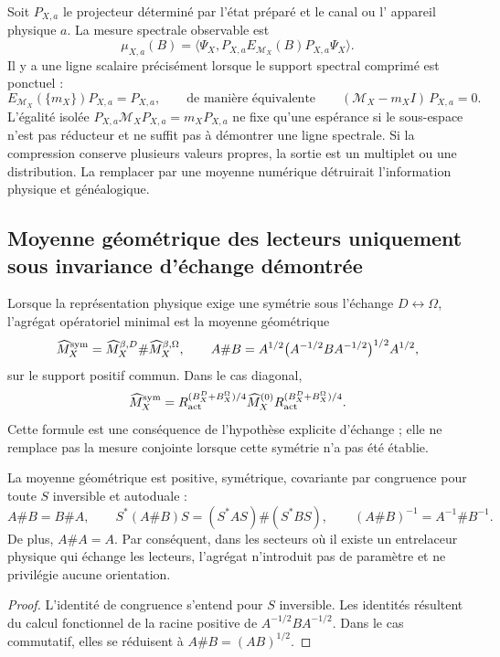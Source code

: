 Soit \(P_{X,a}\) le projecteur déterminé par l'état préparé et le canal ou l'
appareil physique \(a\). La mesure spectrale observable est
\[
 \mu_{X,a}(B)=
 \langle\Psi_X,
 P_{X,a}E_{\mathcal M_X}(B)P_{X,a}\Psi_X\rangle.
\]
Il y a une ligne scalaire précisément lorsque le support spectral comprimé est
ponctuel :
\[
 E_{\mathcal M_X}(\{m_X\})P_{X,a}=P_{X,a},
 \qquad\text{de manière équivalente}\qquad
 (\mathcal M_X-m_X I)\,P_{X,a}=0.
\]
L'égalité isolée
\(P_{X,a}\mathcal M_X P_{X,a}=m_X P_{X,a}\) ne fixe qu'une espérance si le
sous-espace n'est pas réducteur et ne suffit pas à démontrer une ligne spectrale.
Si la compression conserve plusieurs valeurs propres, la sortie est un multiplet ou une
distribution. La remplacer par une moyenne numérique détruirait l'information
physique et généalogique.

\subsection{Moyenne géométrique des lecteurs uniquement sous invariance d'échange démontrée}

Lorsque la représentation physique exige une symétrie sous l'échange
\(D\leftrightarrow\Omega\), l'agrégat opératoriel minimal est la moyenne
géométrique
\[
 \widehat M_X^{\rm sym}
 =\widehat M_X^{\beta,D}\#\widehat M_X^{\beta,\Omega},
 \qquad
 A\#B
 =A^{1/2}\bigl(A^{-1/2}BA^{-1/2}\bigr)^{1/2}A^{1/2},
\]
sur le support positif commun. Dans le cas diagonal,
\[
 \widehat M_X^{\rm sym}
 =R_{\rm act}^{(B_X^D+B_X^\Omega)/4}
  \widehat M_X^{(0)}
  R_{\rm act}^{(B_X^D+B_X^\Omega)/4}.
\]
Cette formule est une conséquence de l'hypothèse explicite d'échange ; elle ne
remplace pas la mesure conjointe lorsque cette symétrie n'a pas été établie.

\begin{theorem}
La moyenne géométrique est positive, symétrique, covariante par congruence pour
toute \(S\) inversible et autoduale :
\[
 A\#B=B\#A,
 \qquad
 S^*(A\#B)S=(S^*AS)\#(S^*BS),
 \qquad
 (A\#B)^{-1}=A^{-1}\#B^{-1}.
\]
De plus, \(A\#A=A\). Par conséquent, dans les secteurs où il existe un
entrelaceur physique qui échange les lecteurs, l'agrégat n'introduit pas de
paramètre et ne privilégie aucune orientation.
\end{theorem}

\begin{proof}
L'identité de congruence s'entend pour \(S\) inversible. Les identités
résultent du calcul fonctionnel de la racine positive de
\(A^{-1/2}BA^{-1/2}\). Dans le cas commutatif, elles se réduisent à
\(A\#B=(AB)^{1/2}\).
\end{proof}

